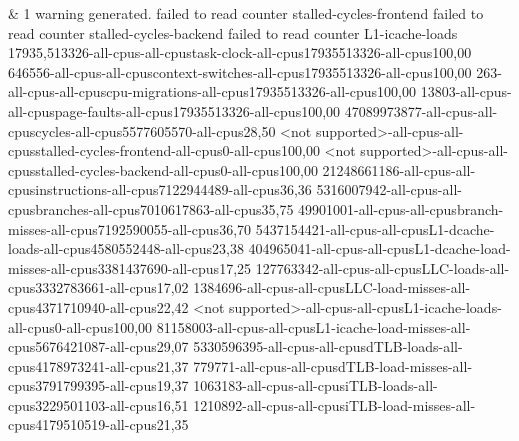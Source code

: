 &
1 warning generated. failed to read counter stalled-cycles-frontend failed to read counter stalled-cycles-backend failed to read counter L1-icache-loads 17935,513326-all-cpus-all-cpustask-clock-all-cpus17935513326-all-cpus100,00 646556-all-cpus-all-cpuscontext-switches-all-cpus17935513326-all-cpus100,00 263-all-cpus-all-cpuscpu-migrations-all-cpus17935513326-all-cpus100,00 13803-all-cpus-all-cpuspage-faults-all-cpus17935513326-all-cpus100,00 47089973877-all-cpus-all-cpuscycles-all-cpus5577605570-all-cpus28,50 <not supported>-all-cpus-all-cpusstalled-cycles-frontend-all-cpus0-all-cpus100,00 <not supported>-all-cpus-all-cpusstalled-cycles-backend-all-cpus0-all-cpus100,00 21248661186-all-cpus-all-cpusinstructions-all-cpus7122944489-all-cpus36,36 5316007942-all-cpus-all-cpusbranches-all-cpus7010617863-all-cpus35,75 49901001-all-cpus-all-cpusbranch-misses-all-cpus7192590055-all-cpus36,70 5437154421-all-cpus-all-cpusL1-dcache-loads-all-cpus4580552448-all-cpus23,38 404965041-all-cpus-all-cpusL1-dcache-load-misses-all-cpus3381437690-all-cpus17,25 127763342-all-cpus-all-cpusLLC-loads-all-cpus3332783661-all-cpus17,02 1384696-all-cpus-all-cpusLLC-load-misses-all-cpus4371710940-all-cpus22,42 <not supported>-all-cpus-all-cpusL1-icache-loads-all-cpus0-all-cpus100,00 81158003-all-cpus-all-cpusL1-icache-load-misses-all-cpus5676421087-all-cpus29,07 5330596395-all-cpus-all-cpusdTLB-loads-all-cpus4178973241-all-cpus21,37 779771-all-cpus-all-cpusdTLB-load-misses-all-cpus3791799395-all-cpus19,37 1063183-all-cpus-all-cpusiTLB-loads-all-cpus3229501103-all-cpus16,51 1210892-all-cpus-all-cpusiTLB-load-misses-all-cpus4179510519-all-cpus21,35
